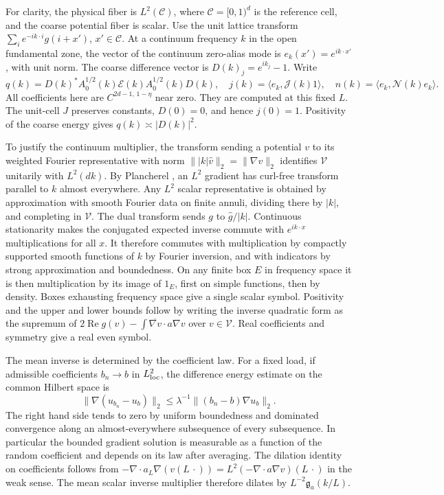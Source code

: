 \documentclass[11pt]{article}
\begin{document}
For clarity, the physical fiber is \(L^2(\mathcal C)\), where \(\mathcal C=[0,1)^d\) is the reference cell, and the coarse potential fiber is scalar. Use the unit lattice transform \(\sum_i e^{-i k\cdot i}g(i+x')\), \(x'\in \mathcal C\). At a continuum frequency \(k\) in the open fundamental zone, the vector of the continuum zero-alias mode is \(e_k(x')=e^{i k\cdot x'}\), with unit norm. The coarse difference vector is \(D(k)_j=e^{ik_j}-1\). Write \[
q(k)=D(k)^* A_0^{1/2}(k)\mathcal E(k) A_0^{1/2}(k)D(k),\quad
j(k)=\langle e_k,\mathcal J(k)1\rangle,\quad
n(k)=\langle e_k,\mathcal N(k)e_k\rangle .
\] All coefficients here are \(C^{2d-1,\,1-\eta}\) near zero. They are computed at this fixed \(L\). The unit-cell \(J\) preserves constants, \(D(0)=0\), and hence \(j(0)=1\). Positivity of the coarse energy gives \(q(k)\asymp |D(k)|^2\).

To justify the continuum multiplier, the transform sending a potential \(v\) to its weighted Fourier representative with norm \(\||k|\widehat v\|_2=\|\nabla v\|_2\) identifies \(\mathscr V\) unitarily with \(L^2(dk)\). By Plancherel \cite[Theorem 1.12.10, p.~200]{TaoFourier}, an \(L^2\) gradient has curl-free transform parallel to \(k\) almost everywhere. Any \(L^2\) scalar representative is obtained by approximation with smooth Fourier data on finite annuli, dividing there by \(|k|\), and completing in \(\mathscr V\). The dual transform sends \(g\) to \(\widehat g/|k|\). Continuous stationarity makes the conjugated expected inverse commute with \(e^{ik\cdot x}\) multiplications for all \(x\). It therefore commutes with multiplication by compactly supported smooth functions of \(k\) by Fourier inversion, and with indicators by strong approximation and boundedness. On any finite box \(E\) in frequency space it is then multiplication by its image of \(1_E\), first on simple functions, then by density. Boxes exhausting frequency space give a single scalar symbol. Positivity and the upper and lower bounds follow by writing the inverse quadratic form as the supremum of \(2\operatorname{Re}g(v)-\int\overline{\nabla v}\cdot a\nabla v\) over \(v\in\mathscr V\). Real coefficients and symmetry give a real even symbol.

The mean inverse is determined by the coefficient law. For a fixed load, if admissible coefficients \(b_n\to b\) in \(L^2_{\rm loc}\), the difference energy estimate on the common Hilbert space is \[
 \|\nabla(u_{b_n}-u_b)\|_2\le
 \lambda^{-1}\|(b_n-b)\nabla u_b\|_2 .
\] The right hand side tends to zero by uniform boundedness and dominated convergence along an almost-everywhere subsequence of every subsequence. In particular the bounded gradient solution is measurable as a function of the random coefficient and depends on its law after averaging. The dilation identity on coefficients follows from \(-\nabla\cdot a_L\nabla(v(L\,\cdot))=L^2(-\nabla\cdot a\nabla v)(L\,\cdot)\) in the weak sense. The mean scalar inverse multiplier therefore dilates by \(L^{-2}\mathfrak g_a(k/L)\).
\end{document}
